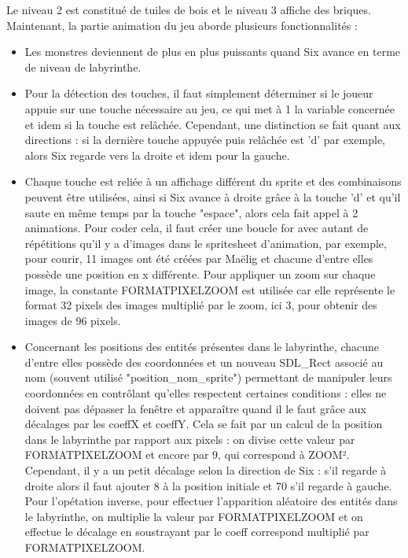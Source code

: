 \documentclass[10pt]{article}
\begin{document}
   Le niveau 2 est constitué de tuiles de bois et le niveau 3 affiche des briques. \\Maintenant, la partie animation du jeu aborde plusieurs fonctionnalités :\\
   \begin{itemize}
   \item Les monstres deviennent de plus en plus puissants quand Six avance en terme de niveau de labyrinthe.\\
   \item Pour la détection des touches, il faut simplement déterminer si le joueur appuie sur une touche nécessaire au jeu, ce qui met à 1 la variable concernée et idem si la touche est relâchée. Cependant, une distinction se fait quant aux directions : si la dernière touche appuyée puis relâchée est 'd' par exemple, alors Six regarde vers la droite et idem pour la gauche.\\
   \item Chaque touche est reliée à un affichage différent du sprite et des combinaisons peuvent être utilisées, ainsi si Six avance à droite grâce à la touche 'd' et qu'il saute en même temps par la touche "espace", alors cela fait appel à 2 animations. Pour coder cela, il faut créer une boucle for avec autant de répétitions qu'il y a d'images dans le spritesheet d'animation, par exemple, pour courir, 11 images ont été créées par Maëlig et chacune d'entre elles possède une position en x différente. Pour appliquer un zoom sur chaque image, la constante FORMATPIXELZOOM est utilisée car elle représente le format 32 pixels des images multiplié par le zoom, ici 3, pour obtenir des images de 96 pixels. \\
   \item Concernant les positions des entités présentes dans le labyrinthe, chacune d'entre elles possède des coordonnées et un nouveau SDL\_Rect associé au nom (souvent utilisé "position\_nom\_sprite") permettant de manipuler leurs coordonnées en contrôlant qu'elles respectent certaines conditions : elles ne doivent pas dépasser la fenêtre et apparaître quand il le faut grâce aux décalages par les coeffX et coeffY. Cela se fait par un calcul de la position dans le labyrinthe par rapport aux pixels : on divise cette valeur par FORMATPIXELZOOM et encore par 9, qui correspond à ZOOM². Cependant, il y a un petit décalage selon la direction de Six : s'il regarde à droite alors il faut ajouter 8 à la position initiale et 70 s'il regarde à gauche. Pour l'opétation inverse, pour effectuer l'apparition aléatoire des entités dans le labyrinthe, on multiplie la valeur par FORMATPIXELZOOM et on effectue le décalage en soustrayant par le coeff correspond multiplié par FORMATPIXELZOOM.\\

\end{itemize}
\end{document}

